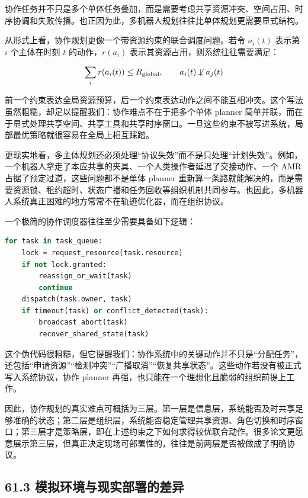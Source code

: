 协作任务并不只是多个单体任务叠加，而是需要考虑共享资源冲突、空间占用、时序协调和失败传播。也正因为此，多机器人规划往往比单体规划更需要显式结构。

从形式上看，协作规划更像一个带资源约束的联合调度问题。若令 \(a_i(t)\) 表示第 \(i\) 个主体在时刻 \(t\) 的动作，\(r(a_i)\) 表示其资源占用，则系统往往需要满足：

\begingroup
\footnotesize
\begin{equation*}
\sum_i r(a_i(t)) \le R_{\text{global}},\qquad
a_i(t) \not\!\perp a_j(t)
\end{equation*}
\endgroup

前一个约束表达全局资源预算，后一个约束表达动作之间不能互相冲突。这个写法虽然粗糙，却足以提醒我们：协作难点不在于把多个单体 planner 简单并联，而在于显式处理共享空间、共享工具和共享时序窗口。一旦这些约束不被写进系统，局部最优策略就很容易在全局上相互踩踏。

更现实地看，多主体规划还必须处理“协议失效”而不是只处理“计划失效”。例如，一个机器人拿走了本应共享的夹具、一个人类操作者延迟了交接动作、一个 AMR 占据了预定过道，这些问题都不是单体 planner 重新算一条路就能解决的，而是需要资源锁、租约超时、状态广播和任务回收等组织机制共同参与。也因此，多机器人系统真正困难的地方常常不在轨迹优化器，而在组织协议。

一个极简的协作调度器往往至少需要具备如下逻辑：

\begin{lstlisting}[language=python]
for task in task_queue:
    lock = request_resource(task.resource)
    if not lock.granted:
        reassign_or_wait(task)
        continue
    dispatch(task.owner, task)
    if timeout(task) or conflict_detected(task):
        broadcast_abort(task)
        recover_shared_state(task)
\end{lstlisting}

这个伪代码很粗糙，但它提醒我们：协作系统中的关键动作并不只是“分配任务”，还包括“申请资源”“检测冲突”“广播取消”“恢复共享状态”。这些动作若没有被正式写入系统协议，协作 planner 再强，也只能在一个理想化且脆弱的组织前提上工作。

因此，协作规划的真实难点可概括为三层。第一层是信息层，系统能否及时共享足够准确的状态；第二层是组织层，系统能否稳定管理共享资源、角色切换和时序窗口；第三层才是策略层，即在上述约束之下如何求得较优联合动作。很多论文更愿意展示第三层，但真正决定现场可部署性的，往往是前两层是否被做成了明确协议。

\subsection*{61.3 模拟环境与现实部署的差异}


